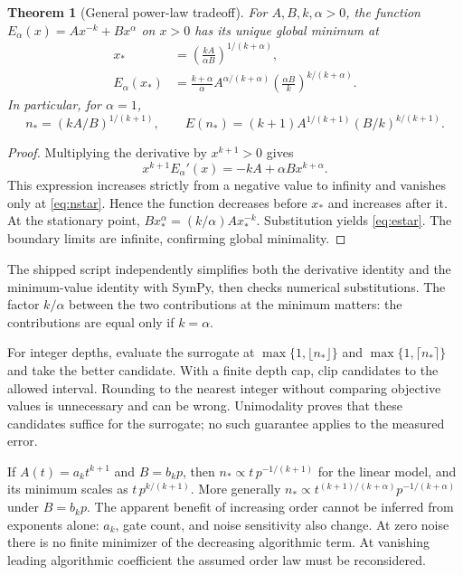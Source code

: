 \documentclass{article}
\newtheorem{theorem}{Theorem}
\begin{document}
\begin{theorem}[General power-law tradeoff]\label{thm:opt}
For $A,B,k,\alpha>0$, the function $E_\alpha(x)=Ax^{-k}+Bx^\alpha$ on $x>0$ has its unique global minimum at
\begin{align}
 x_*&=\left(\frac{kA}{\alpha B}\right)^{1/(k+\alpha)},\label{eq:nstar}\\
 E_\alpha(x_*)&=\frac{k+\alpha}{\alpha}
 A^{\alpha/(k+\alpha)}
 \left(\frac{\alpha B}{k}\right)^{k/(k+\alpha)}.\label{eq:estar}
\end{align}
In particular, for $\alpha=1$,
\[
 n_*=(kA/B)^{1/(k+1)},\qquad
 E(n_*)=(k+1)A^{1/(k+1)}(B/k)^{k/(k+1)}.
\]
\end{theorem}
\begin{proof}
Multiplying the derivative by $x^{k+1}>0$ gives
\[
 x^{k+1}E_\alpha'(x)=-kA+\alpha Bx^{k+\alpha}.
\]
This expression increases strictly from a negative value to infinity and vanishes only at \eqref{eq:nstar}. Hence the function decreases before $x_*$ and increases after it. At the stationary point, $Bx_*^\alpha=(k/\alpha)Ax_*^{-k}$. Substitution yields \eqref{eq:estar}. The boundary limits are infinite, confirming global minimality.
\end{proof}
The shipped script independently simplifies both the derivative identity and the minimum-value identity with SymPy, then checks numerical substitutions. The factor $k/\alpha$ between the two contributions at the minimum matters: the contributions are equal only if $k=\alpha$.

For integer depths, evaluate the surrogate at $\max\{1,\lfloor n_*\rfloor\}$ and $\max\{1,\lceil n_*\rceil\}$ and take the better candidate. With a finite depth cap, clip candidates to the allowed interval. Rounding to the nearest integer without comparing objective values is unnecessary and can be wrong. Unimodality proves that these candidates suffice for the surrogate; no such guarantee applies to the measured error.

If $A(t)=a_k t^{k+1}$ and $B=b_kp$, then $n_*\propto t\,p^{-1/(k+1)}$ for the linear model, and its minimum scales as $t\,p^{k/(k+1)}$. More generally $n_*\propto t^{(k+1)/(k+\alpha)}p^{-1/(k+\alpha)}$ under $B=b_kp$. The apparent benefit of increasing order cannot be inferred from exponents alone: $a_k$, gate count, and noise sensitivity also change. At zero noise there is no finite minimizer of the decreasing algorithmic term. At vanishing leading algorithmic coefficient the assumed order law must be reconsidered.
\end{document}
